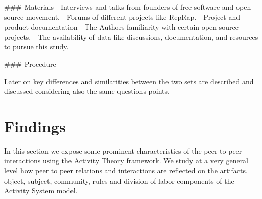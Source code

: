 \documentclass{ICED-Paper}%
\begin{document}
### Materials
- Interviews and talks from founders of free software and open source movement.
- Forums of different projects like RepRap.
- Project and product documentation
- The Authors familiarity with certain open source projects.
- The availability of data like discussions, documentation, and resources to pursue this study.

### Procedure

Later on key differences and similarities between the two sets are described and discussed considering also the same questions points.

\section{Findings}

In this section we expose some prominent characteristics of the peer to peer interactions using the Activity Theory framework. We study at a very general level how peer to peer relations and interactions are reflected on the artifacts, object, subject, community, rules and division of labor components of the Activity System model.
\end{document}
